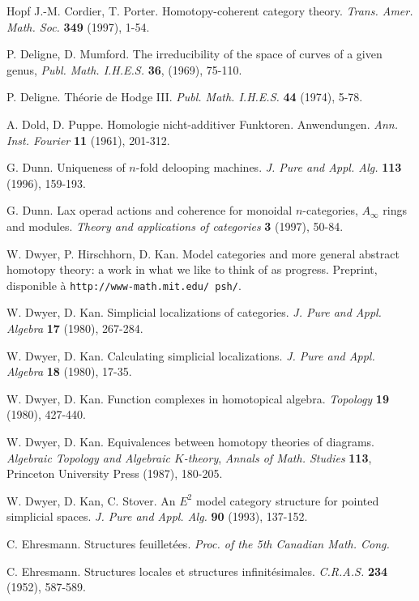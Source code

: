 \documentclass[12pt]{article}
\begin{document}
\begin{thebibliography}{Hopf}
J.-M. Cordier, T. Porter. Homotopy-coherent category theory. {\em Trans. Amer.
Math. Soc.} {\bf 349} (1997), 1-54.

P. Deligne, D. Mumford. The irreducibility of the space of curves of a given
genus, {\em  Publ. Math. I.H.E.S.} {\bf 36}, (1969), 75-110.

P. Deligne. Th\'eorie de Hodge III. {\em  Publ. Math. I.H.E.S.}
{\bf 44} (1974), 5-78.

A. Dold, D. Puppe. Homologie nicht-additiver Funktoren. Anwendungen. {\em
Ann. Inst. Fourier} {\bf
11} (1961), 201-312.

G. Dunn. Uniqueness of $n$-fold delooping machines. {\em J. Pure and Appl. Alg.}
{\bf 113} (1996), 159-193.

G. Dunn. Lax operad actions and coherence for monoidal $n$-categories,
$A_{\infty}$ rings and modules. {\em Theory and applications of categories}
{\bf 3} (1997), 50-84.

W. Dwyer, P. Hirschhorn, D. Kan. Model categories and more general abstract
homotopy theory: a work in what we like to think of as progress. Preprint,
disponible \`a {\tt http://www-math.mit.edu/~psh/}.

W. Dwyer, D. Kan. Simplicial localizations of categories. {\em J. Pure and Appl.
Algebra} {\bf 17} (1980), 267-284.

W. Dwyer, D. Kan. Calculating simplicial localizations. {\em J. Pure and
Appl. Algebra} {\bf 18} (1980), 17-35.

W. Dwyer, D. Kan. Function complexes in homotopical algebra. {\em Topology}
{\bf 19} (1980), 427-440.

W. Dwyer, D. Kan. Equivalences between homotopy theories of diagrams.
{\em Algebraic Topology and Algebraic $K$-theory}, {\em Annals of Math. Studies}
{\bf 113}, Princeton University Press (1987), 180-205.

W. Dwyer, D. Kan, C. Stover. An $E^2$ model category structure for pointed
simplicial spaces. {\em J. Pure and Appl. Alg.} {\bf 90} (1993), 137-152.

C. Ehresmann. Structures feuillet\'ees. {\em Proc. of the 5th
Canadian Math. Cong.}

C. Ehresmann. Structures locales et structures infinit\'esimales.
{\em C.R.A.S.} {\bf 234} (1952), 587-589.


\end{thebibliography}
\end{document}
